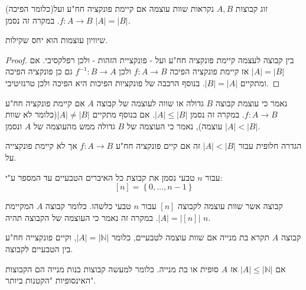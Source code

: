 \documentclass{tstextbook}
\begin{document}
\begin{definition}
זוג קבוצות \(A,B\) נקראות שוות עוצמה אם קיימת פונקציה חח"ע ועל(כלומר הפיכה) \(f:A\to B\). במקרה זה נסמן \(|A|=|B|\).

\end{definition}
\begin{proposition}
שיוויון עוצמות הוא יחס שקילות.

\end{proposition}
\begin{proof}
בין קבוצה לעצמה קיימת פונקציה חח"ע ועל - פונקציית הזהות - ולכן רפלקסיבי. אם \(|A|=|B|\) אז קיימת פונקציה הפיכה \(f:A\to B\) ולכן \(f^{-1}:B\to A\) גם כן פונקציה הפיכה ומתקיים \(|B|=|A|\). בנוסף הרכבה של פונקציות הפיכות היא הפיכה ולכן טרנזיטיבי.

\end{proof}
\begin{definition}
נאמר כי עוצמת קבוצה \(B\) גדולה או שווה לעוצמה של קבוצה \(A\) אם קיימת פונקציה חח"ע \(f:A\to B\). במקרה זה נסמן \(|A|\leq |B|\). אם בנוסף מתקיים \(|A| \neq |B|\)(כלומר לא שוות עוצמה), נאמר כי העוצמה של \(B\) גדולה ממש מהעוצמה של \(A\) ונסמן \(|A|<|B|\).

\end{definition}
\begin{remark}
הגדרה חלופית עבור \(|A|<|B|\) זה אם קיים פונקציה חח"ע \(f:A\to B\) אך לא קיימת פונקצייה על.

\end{remark}
\begin{symbolize}
עבור \(n\) טבעי נסמן את קבוצת כל האיברים הטבעיים עד המספר ע"י:
$$[n]=\left\{  0,\dots, n-1  \right\}$$

\end{symbolize}
\begin{definition}
קבוצה אשר שוות עוצמה לקבוצה \([n]\) עבור \(n\) טבעי כלשהו. כלומר קבוצה \(A\) המקיימת \(|A|=|[n]|\).  במקרה זה נאמר כי העוצמה של הקבוצה תהיה \(n\).

\end{definition}
\begin{proposition}
קבוצה \(A\) תקרא בת מנייה אם שוות עוצמה לטבעיים, כלומר \(|A|=|\mathbb{N}|\), וקיים פונקצייה חח"ע בין הטבעיים לקבוצה.

\end{proposition}
\begin{proposition}
אם \(|A|\leq |\mathbb{N}|\) אז \(A\) סופית או בת מנייה. כלומר למעשה קבוצות בנות מנייה הם הקבוצות האינסופיות "הקטנות ביותר".

\end{proposition}
\end{document}
